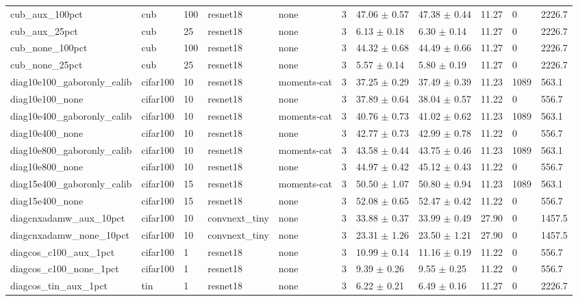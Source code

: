 \begin{tabular}{lllllllllll}
cub_aux_100pct & cub & 100 & resnet18 & none & 3 & 47.06 $\pm$ 0.57 & 47.38 $\pm$ 0.44 & 11.27 & 0 & 2226.7 \\
cub_aux_25pct & cub & 25 & resnet18 & none & 3 & 6.13 $\pm$ 0.18 & 6.30 $\pm$ 0.14 & 11.27 & 0 & 2226.7 \\
cub_none_100pct & cub & 100 & resnet18 & none & 3 & 44.32 $\pm$ 0.68 & 44.49 $\pm$ 0.66 & 11.27 & 0 & 2226.7 \\
cub_none_25pct & cub & 25 & resnet18 & none & 3 & 5.57 $\pm$ 0.14 & 5.80 $\pm$ 0.19 & 11.27 & 0 & 2226.7 \\
diag10e100_gaboronly_calib & cifar100 & 10 & resnet18 & moments-cat & 3 & 37.25 $\pm$ 0.29 & 37.49 $\pm$ 0.39 & 11.23 & 1089 & 563.1 \\
diag10e100_none & cifar100 & 10 & resnet18 & none & 3 & 37.89 $\pm$ 0.64 & 38.04 $\pm$ 0.57 & 11.22 & 0 & 556.7 \\
diag10e400_gaboronly_calib & cifar100 & 10 & resnet18 & moments-cat & 3 & 40.76 $\pm$ 0.73 & 41.02 $\pm$ 0.62 & 11.23 & 1089 & 563.1 \\
diag10e400_none & cifar100 & 10 & resnet18 & none & 3 & 42.77 $\pm$ 0.73 & 42.99 $\pm$ 0.78 & 11.22 & 0 & 556.7 \\
diag10e800_gaboronly_calib & cifar100 & 10 & resnet18 & moments-cat & 3 & 43.58 $\pm$ 0.44 & 43.75 $\pm$ 0.46 & 11.23 & 1089 & 563.1 \\
diag10e800_none & cifar100 & 10 & resnet18 & none & 3 & 44.97 $\pm$ 0.42 & 45.12 $\pm$ 0.43 & 11.22 & 0 & 556.7 \\
diag15e400_gaboronly_calib & cifar100 & 15 & resnet18 & moments-cat & 3 & 50.50 $\pm$ 1.07 & 50.80 $\pm$ 0.94 & 11.23 & 1089 & 563.1 \\
diag15e400_none & cifar100 & 15 & resnet18 & none & 3 & 52.08 $\pm$ 0.65 & 52.47 $\pm$ 0.42 & 11.22 & 0 & 556.7 \\
diagcnxadamw_aux_10pct & cifar100 & 10 & convnext_tiny & none & 3 & 33.88 $\pm$ 0.37 & 33.99 $\pm$ 0.49 & 27.90 & 0 & 1457.5 \\
diagcnxadamw_none_10pct & cifar100 & 10 & convnext_tiny & none & 3 & 23.31 $\pm$ 1.26 & 23.50 $\pm$ 1.21 & 27.90 & 0 & 1457.5 \\
diagcos_c100_aux_1pct & cifar100 & 1 & resnet18 & none & 3 & 10.99 $\pm$ 0.14 & 11.16 $\pm$ 0.19 & 11.22 & 0 & 556.7 \\
diagcos_c100_none_1pct & cifar100 & 1 & resnet18 & none & 3 & 9.39 $\pm$ 0.26 & 9.55 $\pm$ 0.25 & 11.22 & 0 & 556.7 \\
diagcos_tin_aux_1pct & tin & 1 & resnet18 & none & 3 & 6.22 $\pm$ 0.21 & 6.49 $\pm$ 0.16 & 11.27 & 0 & 2226.7 \\

\end{tabular}
